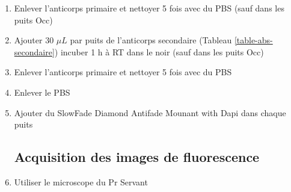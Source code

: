 \begin{enumerate}
\item Enlever l'anticorps primaire et nettoyer 5 fois avec du PBS (sauf dans les puits Occ)
\item Ajouter 30 $\mu L$ par puits de l'anticorps secondaire (Tableau \ref{table-abs-secondaire}) incuber 1 h à RT dans le noir (sauf dans les puits Occ)
\item Enlever l'anticorps primaire et nettoyer 5 fois avec du PBS
\item Enlever le PBS
\item Ajouter du SlowFade Diamond Antifade Mounant with Dapi dans chaque puits

\subsection{Acquisition des images de fluorescence}

\item Utiliser le microscope du Pr Servant
\end{enumerate}